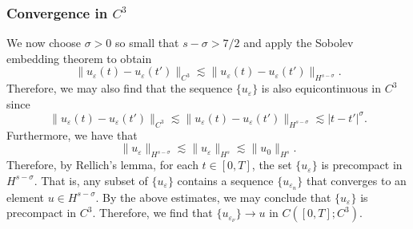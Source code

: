 \documentclass[reqno]{amsart}
\theoremstyle{plain}
\numberwithin{equation}{section}
\newcommand{\ee}{\varepsilon}
\newcommand{\s}{\sigma}
\begin{document}
\subsubsection{Convergence in $C^3$}We now choose $\s>0$ so small that $s-\s>7/2$ and apply the Sobolev embedding theorem to obtain
\[
\|u_\ee(t)-u_\ee(t')\|_{C^3} \lesssim \|u_\ee(t)-u_\ee(t')\|_{H^{s-\s}}.
\]
Therefore, we may also find that the sequence $\{u_\ee\}$ is also equicontinuous in $C^3$ since
\[
\|u_\ee(t)-u_\ee(t')\|_{C^3} \lesssim \|u_\ee(t)-u_\ee(t')\|_{H^{s-\s}} \lesssim |t-t'|^\s.
\]
Furthermore, we have that
\[
\|u_\ee\|_{H^{s-\s}} \lesssim \|u_\ee\|_{H^s} \lesssim \|u_0\|_{H^s}.
\]
Therefore, by Rellich's lemma, for each $t \in [0,T]$, the set $\{u_\ee\}$ is precompact in $H^{s-\s}$.  That is, any subset of $\{u_\ee\}$ contains a sequence $\{u_{\ee_n}\}$ that converges to an element $u \in H^{s-\s}$.  By the above estimates, we may conclude that $\{u_\ee\}$ is precompact in $C^3$.  Therefore, we find that $\{u_{\ee_\nu}\} \to u$ in $C([0,T];C^3)$.
\end{document}

